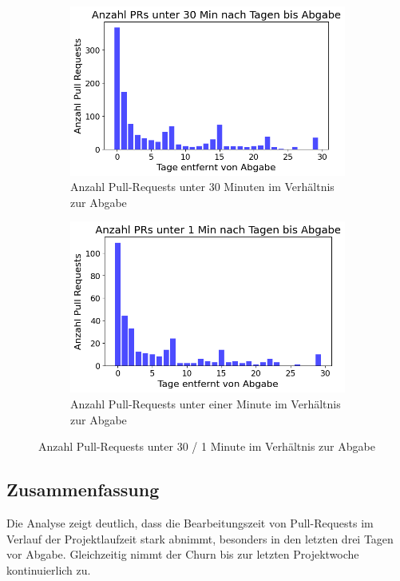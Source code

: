\begin{figure}[htbp]
    \centering
    \begin{subfigure}[b]{0.48\textwidth}
        \centering
        \includegraphics[width=\textwidth]{Figures/anz-prs-under-30-min.png}
    \caption{Anzahl Pull-Requests unter 30 Minuten im Verhältnis zur Abgabe}
    \label{fig:anz-prs-under-30-min}
    \end{subfigure}
    \hfill
    \begin{subfigure}[b]{0.48\textwidth}
        \centering
        \includegraphics[width=\textwidth]{Figures/anz-prs-under-1-min.png}
    \caption{Anzahl Pull-Requests unter einer Minute im Verhältnis zur Abgabe}
    \label{fig:anz-prs-under-1-min}
    \end{subfigure}
    \caption{Anzahl Pull-Requests unter 30 / 1 Minute im Verhältnis zur Abgabe}
    \label{fig:anz-prs-under-x-mins}
\end{figure}

\subsection{Zusammenfassung}
Die Analyse zeigt deutlich, dass die Bearbeitungszeit von Pull-Requests im Verlauf der Projektlaufzeit stark abnimmt, besonders in den letzten drei Tagen vor Abgabe. Gleichzeitig nimmt der Churn bis zur letzten Projektwoche kontinuierlich zu.


